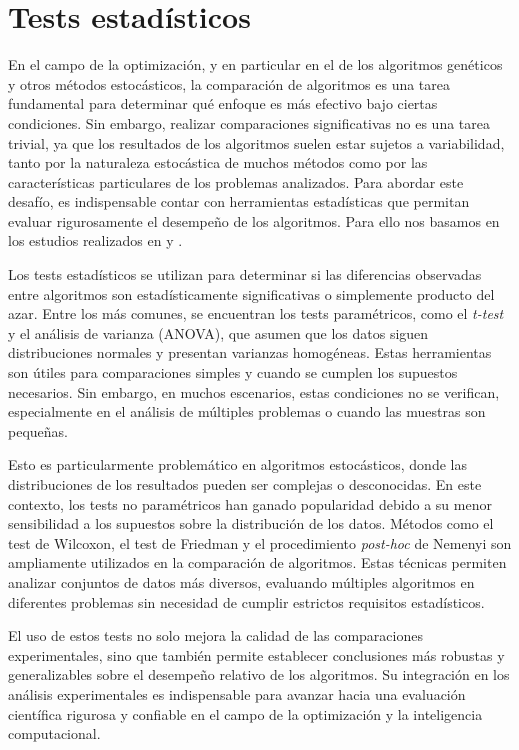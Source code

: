 
\chapter{Tests estadísticos}

En el campo de la optimización, y en particular en el de los algoritmos genéticos y otros métodos estocásticos, la comparación de algoritmos es una tarea fundamental para determinar qué enfoque es más efectivo bajo ciertas condiciones. Sin embargo, realizar comparaciones significativas no es una tarea trivial, ya que los resultados de los algoritmos suelen estar sujetos a variabilidad, tanto por la naturaleza estocástica de muchos métodos como por las características particulares de los problemas analizados. Para abordar este desafío, es indispensable contar con herramientas estadísticas que permitan evaluar rigurosamente el desempeño de los algoritmos. Para ello nos basamos en los estudios realizados en \cite{Tests_01} y \cite{Tests_02}.

Los tests estadísticos se utilizan para determinar si las diferencias observadas entre algoritmos son estadísticamente significativas o simplemente producto del azar. Entre los más comunes, se encuentran los tests paramétricos, como el \textit{t-test} y el análisis de varianza (ANOVA), que asumen que los datos siguen distribuciones normales y presentan varianzas homogéneas. Estas herramientas son útiles para comparaciones simples y cuando se cumplen los supuestos necesarios. Sin embargo, en muchos escenarios, estas condiciones no se verifican, especialmente en el análisis de múltiples problemas o cuando las muestras son pequeñas.

Esto es particularmente problemático en algoritmos estocásticos, donde las distribuciones de los resultados pueden ser complejas o desconocidas. En este contexto, los tests no paramétricos han ganado popularidad debido a su menor sensibilidad a los supuestos sobre la distribución de los datos. Métodos como el test de Wilcoxon, el test de Friedman y el procedimiento \textit{post-hoc} de Nemenyi son ampliamente utilizados en la comparación de algoritmos. Estas técnicas permiten analizar conjuntos de datos más diversos, evaluando múltiples algoritmos en diferentes problemas sin necesidad de cumplir estrictos requisitos estadísticos.

El uso de estos tests no solo mejora la calidad de las comparaciones experimentales, sino que también permite establecer conclusiones más robustas y generalizables sobre el desempeño relativo de los algoritmos. Su integración en los análisis experimentales es indispensable para avanzar hacia una evaluación científica rigurosa y confiable en el campo de la optimización y la inteligencia computacional.

